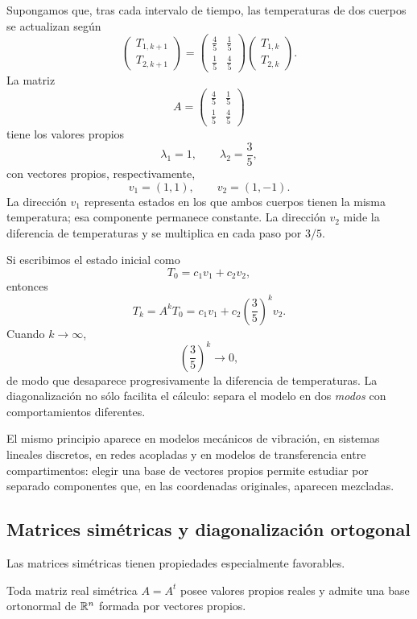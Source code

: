 \begin{example}
Supongamos que, tras cada intervalo de tiempo, las temperaturas de dos cuerpos se actualizan según
\[
\begin{pmatrix}
T_{1,k+1}\\
T_{2,k+1}
\end{pmatrix}
=
\begin{pmatrix}
\frac45&\frac15\\[1mm]
\frac15&\frac45
\end{pmatrix}
\begin{pmatrix}
T_{1,k}\\
T_{2,k}
\end{pmatrix}.
\]
La matriz
\[
A=\begin{pmatrix}
\frac45&\frac15\\[1mm]
\frac15&\frac45
\end{pmatrix}
\]
tiene los valores propios
\[
\lambda_1=1,
\qquad
\lambda_2=\frac35,
\]
con vectores propios, respectivamente,
\[
v_1=(1,1),
\qquad
v_2=(1,-1).
\]
La dirección $v_1$ representa estados en los que ambos cuerpos tienen la misma temperatura; esa componente permanece constante. La dirección $v_2$ mide la diferencia de temperaturas y se multiplica en cada paso por $3/5$.

Si escribimos el estado inicial como
\[
T_0=c_1v_1+c_2v_2,
\]
entonces
\[
T_k=A^kT_0=c_1v_1+c_2\left(\frac35\right)^kv_2.
\]
Cuando $k\to\infty$,
\[
\left(\frac35\right)^k\to0,
\]
de modo que desaparece progresivamente la diferencia de temperaturas. La diagonalización no sólo facilita el cálculo: separa el modelo en dos \emph{modos} con comportamientos diferentes.
\end{example}

El mismo principio aparece en modelos mecánicos de vibración, en sistemas lineales discretos, en redes acopladas y en modelos de transferencia entre compartimentos: elegir una base de vectores propios permite estudiar por separado componentes que, en las coordenadas originales, aparecen mezcladas.

\subsection{Matrices simétricas y diagonalización ortogonal}

Las matrices simétricas tienen propiedades especialmente favorables.

\begin{theorem}
Toda matriz real simétrica $A=A^t$ posee valores propios reales y admite una base ortonormal de $\mathbb{R}^n$ formada por vectores propios.
\end{theorem}

